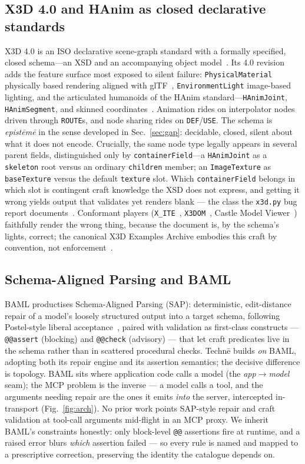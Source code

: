 \documentclass[sigconf,nonacm,screen,anonymous]{acmart}
\begin{document}
\subsection{X3D 4.0 and HAnim as closed declarative standards}
X3D 4.0 is an ISO declarative scene-graph standard with a formally specified, closed schema---an XSD and an accompanying object model~\cite{x3d4,x3duom}. Its 4.0 revision adds the feature surface most exposed to silent failure: \texttt{PhysicalMaterial} physically based rendering aligned with glTF~\cite{gltf}, \texttt{EnvironmentLight} image-based lighting, and the articulated humanoids of the HAnim standard---\texttt{HAnimJoint}, \texttt{HAnimSegment}, and skinned coordinates~\cite{hanim}. Animation rides on interpolator nodes driven through \texttt{ROUTE}s, and node sharing rides on \texttt{DEF}/\texttt{USE}. The schema is \emph{epistēmē} in the sense developed in Sec.~\ref{sec:gap}: decidable, closed, silent about what it does not encode. Crucially, the same node type legally appears in several parent fields, distinguished only by \texttt{containerField}---a \texttt{HAnimJoint} as a \texttt{skeleton} root versus an ordinary \texttt{children} member; an \texttt{ImageTexture} as \texttt{baseTexture} versus the default \texttt{texture} slot. Which \texttt{containerField} belongs in which slot is contingent craft knowledge the XSD does not express, and getting it wrong yields output that validates yet renders blank --- the class the \texttt{x3d.py} bug report documents~\cite{x3dpy}. Conformant players (\texttt{X\_ITE}~\cite{xite}, \texttt{X3DOM}~\cite{x3dom}, Castle Model Viewer~\cite{castle}) faithfully render the wrong thing, because the document is, by the schema's lights, correct; the canonical X3D Examples Archive embodies this craft by convention, not enforcement~\cite{x3dexamples}.

\subsection{Schema-Aligned Parsing and BAML}
BAML productises Schema-Aligned Parsing (SAP): deterministic, edit-distance repair of a model's loosely structured output into a target schema, following Postel-style liberal acceptance~\cite{baml,postel}, paired with validation as first-class constructs --- \texttt{@@assert} (blocking) and \texttt{@@check} (advisory) --- that let craft predicates live in the schema rather than in scattered procedural checks. Technē builds \emph{on} BAML, adopting both its repair engine and its assertion semantics; the decisive difference is topology. BAML sits where application code calls a model (the \emph{app$\rightarrow$model} seam); the MCP problem is the inverse --- a model calls a tool, and the arguments needing repair are the ones it emits \emph{into} the server, intercepted in-transport (Fig.~\ref{fig:arch}). No prior work points SAP-style repair and craft validation at tool-call arguments mid-flight in an MCP proxy. We inherit BAML's constraints honestly: only block-level \texttt{@@} assertions fire at runtime, and a raised error blurs \emph{which} assertion failed --- so every rule is named and mapped to a prescriptive correction, preserving the identity the catalogue depends on.
\end{document}
